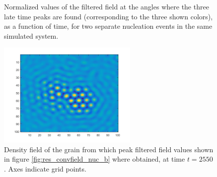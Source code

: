 \begin{figure}[!h]
	\centering
	\label{fig:res_convfield_nuc_a}
	\caption{Normalized values of the filtered field at the angles where the three late time peaks are found (corresponding to the three shown colors), as a function of time, for two separate nucleation events in the same simulated system.}\label{fig:res_convfield_nuc}
\end{figure}

\begin{figure}[!h]
	\centering
	\includegraphics[width=0.6\textwidth]{fig_res/res_convfield_examplegrain}
	\caption{Density field of the grain from which peak filtered field values shown in figure \ref{fig:res_convfield_nuc_b} where obtained, at time $t=2550$. Axes indicate grid points.}\label{fig:res_convfield_examplegrain}
\end{figure}

